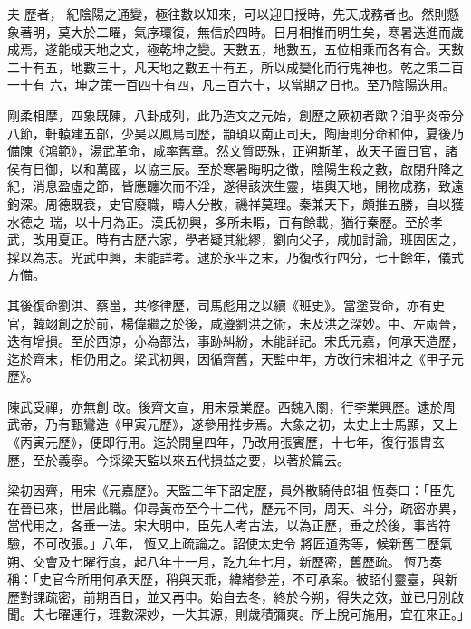 
\begin{pinyinscope}

 夫
 歷者，
 紀陰陽之通變，極往數以知來，可以迎日授時，先天成務者也。然則懸象著明，莫大於二曜，氣序環復，無信於四時。日月相推而明生矣，寒暑迭進而歲成焉，遂能成天地之文，極乾坤之變。天數五，地數五，五位相乘而各有合。天數二十有五，地數三十，凡天地之數五十有五，所以成變化而行鬼神也。乾之策二百一十有
 六，坤之策一百四十有四，凡三百六十，以當期之日也。至乃陰陽迭用。



 剛柔相摩，四象既陳，八卦成列，此乃造文之元始，創歷之厥初者歟？洎乎炎帝分八節，軒轅建五部，少昊以鳳鳥司歷，顓頊以南正司天，陶唐則分命和仲，夏後乃備陳《鴻範》，湯武革命，咸率舊章。然文質既殊，正朔斯革，故天子置日官，諸侯有日御，以和萬國，以協三辰。至於寒暑晦明之徵，陰陽生殺之數，啟閉升降之紀，消息盈虛之節，皆應躔次而不淫，遂得該浹生靈，堪輿天地，開物成務，致遠鉤深。周德既衰，史官廢職，疇人分散，禨祥莫理。秦兼天下，頗推五勝，自以獲水德之
 瑞，以十月為正。漢氏初興，多所未暇，百有餘載，猶行秦歷。至於孝武，改用夏正。時有古歷六家，學者疑其紕繆，劉向父子，咸加討論，班固因之，採以為志。光武中興，未能詳考。逮於永平之末，乃復改行四分，七十餘年，儀式方備。



 其後復命劉洪、蔡邕，共修律歷，司馬彪用之以續《班史》。當塗受命，亦有史官，韓翊創之於前，楊偉繼之於後，咸遵劉洪之術，未及洪之深妙。中、左兩晉，迭有增損。至於西涼，亦為蔀法，事跡糾紛，未能詳記。宋氏元嘉，何承天造歷，迄於齊末，相仍用之。梁武初興，因循齊舊，天監中年，方改行宋祖沖之《甲子元歷》。



 陳武受禪，亦無創
 改。後齊文宣，用宋景業歷。西魏入關，行李業興歷。逮於周武帝，乃有甄鸞造《甲寅元歷》，遂參用推步焉。大象之初，太史上士馬顯，又上《丙寅元歷》，便即行用。迄於開皇四年，乃改用張賓歷，十七年，復行張胄玄歷，至於義寧。今採梁天監以來五代損益之要，以著於篇云。



 梁初因齊，用宋《元嘉歷》。天監三年下詔定歷，員外散騎侍郎祖恆奏曰：「臣先在晉已來，世居此職。仰尋黃帝至今十二代，歷元不同，周天、斗分，疏密亦異，當代用之，各垂一法。宋大明中，臣先人考古法，以為正歷，垂之於後，事皆符驗，不可改張。」八年，恆又上疏論之。詔使太史令
 將匠道秀等，候新舊二歷氣朔、交會及七曜行度，起八年十一月，訖九年七月，新歷密，舊歷疏。恆乃奏稱：「史官今所用何承天歷，稍與天乖，緯緒參差，不可承案。被詔付靈臺，與新歷對課疏密，前期百日，並又再申。始自去冬，終於今朔，得失之效，並已月別啟聞。夫七曜運行，理數深妙，一失其源，則歲積彌爽。所上脫可施用，宜在來正。」




\end{pinyinscope}
